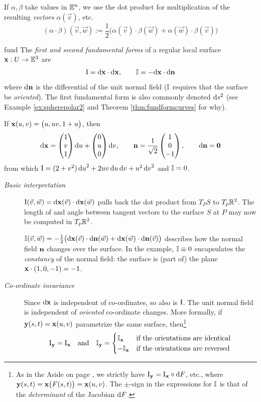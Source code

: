 If $\alpha,\beta$ take values in $\mathbb{E}^n$, we use the dot product for multiplication of the resulting \emph{vectors} $\alpha(\vec v)$, etc.
\[
	(\alpha\cdot\beta)(\vec v,\vec w):=\frac 12\bigl(\alpha(\vec v)\cdot\beta(\vec w)+\alpha(\vec w)\cdot\beta(\vec v)\bigr)
\]

\begin{defn}{}{fund}
	The \emph{first and second fundamental forms} of a regular local surface ${\mathbf{x}}:U\to\mathbb{E}^3$ are
	\[
		\mathrm{I}=\mathrm{d}{\mathbf{x}}\cdot\mathrm{d}{\mathbf{x}},\qquad \mathbb{I}=-\mathrm{d}{\mathbf{x}}\cdot\mathrm{d}{\mathbf{n}}
	\]
	where $\mathrm{d}{\mathbf{n}}$ is the differential of the unit normal field ($\mathbb{I}$ requires that the surface be \emph{oriented}). The first fundamental form is also commonly denoted $\mathrm{d} s^2$ (see Example \ref{ex:spherepolar2} and Theorem \ref{thm:fundformcurves} for why).
\end{defn}


\begin{example}{}{}
	If ${\mathbf{x}}(u,v)=\bigl(u,uv,1+u\bigr)$, then 
	\[
		\mathrm{d}{\mathbf{x}}=\begin{pmatrix}1\\v\\1\end{pmatrix}{\mathrm{d}u}+\begin{pmatrix}0\\u\\0\end{pmatrix}{\mathrm{d}v},\qquad {\mathbf{n}}=\frac 1{\sqrt 2}\begin{pmatrix}1\\0\\-1\end{pmatrix},\qquad \mathrm{d}{\mathbf{n}}=\mathbf{0}
	\]
	from which $\mathrm{I}=(2+v^2)\,{\mathrm{d} u}^2+2uv\,{\mathrm{d} u}\,{\mathrm{d} v}+u^2\,{\mathrm{d} v}^2$ and $\mathbb{I}=0$.
\end{example}

\goodbreak



\begin{description}
	\item[\normalfont\emph{Basic interpretation}]\label{sec:formsmeaning} $\mathrm{I}(\vec v,\vec w)=\mathrm{d}{\mathbf{x}}(\vec v)\cdot\mathrm{d}{\mathbf{x}}(\vec w)$ pulls back the dot product from $T_PS$ to $T_p\mathbb{R}^2$. The length of and angle between tangent vectors to the surface $S$ at $P$ may now be computed in $T_p\mathbb{R}^2$.\par
	 	$\mathbb{I}(\vec v,\vec w)=-\frac 12\bigl(\mathrm{d}{\mathbf{x}}(\vec v)\cdot\mathrm{d}{\mathbf{n}}(\vec w)+\mathrm{d}{\mathbf{x}}(\vec w)\cdot\mathrm{d}{\mathbf{n}}(\vec v)\bigr)$ describes how the normal field ${\mathbf{n}}$ changes over the surface. In the example, $\mathbb{I}\equiv 0$ encapsulates the \emph{constancy} of the normal field: the surface is (part of) the plane ${\mathbf{x}}\cdot(1,0,-1)=-1$.
	
	\item[\normalfont\emph{Co-ordinate invariance}] Since $\mathrm{d}{\mathbf{x}}$ is independent of co-ordinates, so also is $\mathrm{I}$. The unit normal field is independent of \emph{oriented} co-ordinate changes. More formally, if ${\mathbf{y}}(s,t)={\mathbf{x}}(u,v)$ parametrize the same surface, then\footnote{As in the Aside on page \pageref{aside:coc}, we strictly have $\mathrm{I}_{\mathbf{y}}=\mathrm{I}_{\mathbf{x}}\circ \mathrm{d} F$, etc., where ${\mathbf{y}}(s,t)={\mathbf{x}}\bigl(F(s,t)\bigr)={\mathbf{x}}(u,v)$. The $\pm$-sign in the expressions for $\mathbb{I}$ is that of the \emph{determinant} of the Jacobian $\mathrm{d} F$.}
	\[
		\mathrm{I}_{\mathbf{y}}=\mathrm{I}_{\mathbf{x}}\quad \text{and}\quad \mathbb{I}_{\mathbf{y}}=
		\begin{cases}
			\mathbb{I}_{\mathbf{x}}&\text{if the orientations are identical}\\
			-\mathbb{I}_{\mathbf{x}}&\text{if the orientations are reversed}
		\end{cases}
	\]
\end{description}

